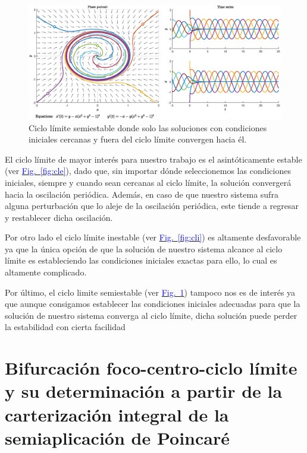 \documentclass[12pt,a4paper]{report} %
\newcommand{\fref}[1]{\hyperref[#1]{\textcolor{blue}{Fig.~\ref*{#1}}}}
\begin{document}
	\begin{figure}[h]
		\centering
		\includegraphics[width=1\textwidth]{clpe.eps}
		\caption{Ciclo límite semiestable donde solo las soluciones con condiciones iniciales cercanas y fuera del ciclo límite convergen hacia él.}
		\label{fig:clpe}
	\end{figure}\smallskip
	
	\vspace{0.5cm} El ciclo límite de mayor interés para nuestro trabajo es el asintóticamente estable (ver \fref{fig:cle}), dado que, sin importar dónde seleccionemos las condiciones iniciales, siempre y cuando sean cercanas al ciclo límite, la solución convergerá hacia la oscilación periódica. Además, en caso de que nuestro sistema sufra alguna perturbación que lo aleje de la oscilación periódica, este tiende a regresar y restablecer dicha oscilación.
	
	\vspace{0.5cm}Por otro lado el ciclo límite inestable (ver \fref{fig:cli}) es altamente desfavorable ya que la única opción de que la solución de nuestro sistema alcance al ciclo límite es estableciendo las condiciones iniciales exactas para ello, lo cual es altamente complicado.
	
	\vspace{0.5cm} Por último, el ciclo limite semiestable (ver \fref{fig:clpe}) tampoco nos es de interés ya que aunque consigamos establecer las condiciones iniciales adecuadas para que la solución de nuestro sistema converga al ciclo límite, dicha solución puede perder la estabilidad con cierta facilidad
	
	\newpage
	
	\section{Bifurcación foco-centro-ciclo límite y su determinación a partir de la carterización integral de la semiaplicación de Poincaré}
	
\end{document}
